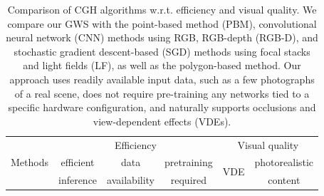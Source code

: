 \renewcommand{\arraystretch}{1.1}

\setlength{\tabcolsep}{4pt} 
\setlength{\textfloatsep}{10pt}
\begin{table}[t!]
    \centering
    \captionsetup{aboveskip=0pt, belowskip=3pt}
    {\footnotesize 
    
    \caption{Comparison of CGH algorithms w.r.t. efficiency and visual quality. We compare our GWS with the point-based method (PBM), convolutional neural network (CNN) methods using RGB, RGB-depth (RGB-D), and stochastic gradient descent-based (SGD) methods using focal stacks and light fields (LF), as well as the polygon-based method. Our approach uses readily available input data, such as a few photographs of a real scene, does not require pre-training any networks tied to a specific hardware configuration, and naturally supports occlusions and view-dependent effects (VDEs). %
    }
    \label{tab:cgh_comp_table}
    
    \begin{tabular}{ m{2.2cm}|ccc|cc}
        \multirow{3}{*}{{\centering Methods}} & \multicolumn{3}{c|}{Efficiency} & \multicolumn{2}{c}{Visual quality} \\ %
                              & {\headfontsize  efficient}   & {\headfontsize data } & \headfontsize pretraining & \multirow{2}{*}{VDE} & {\headfontsize photorealistic } \\ %
                                 &               \headfontsize inference                       & \headfontsize  availability    & \headfontsize required &   & \headfontsize  content    \\ %
                                 

\end{tabular}}
\end{table}
